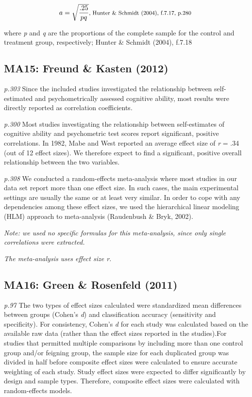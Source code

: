 \documentclass{article}
\begin{document}
\begin{equation*}
a = \sqrt{\frac{.25}{pq}}  \mbox{\footnotesize, Hunter \& Schmidt (2004), f.7.17, p.280 }
\end{equation*}

{\footnotesize where \textit{p} and \textit{q} are the proportions of the complete sample for the control and treatment group, respectively; Hunter \& Schmidt (2004), f.7.18 }


\subsection*{MA15: Freund \& Kasten (2012)}

\textit{p.303} Since the included studies investigated the relationship between self-estimated and psychometrically assessed cognitive ability, most results were directly reported as correlation coefficients. 

\textit{p.300} Most studies investigating the relationship between self-estimates of cognitive ability and psychometric test scores report significant, positive correlations. In 1982, Mabe and West reported an average effect size of \textit{r} = .34 (out of 12 effect sizes). We therefore expect to find a significant, positive overall relationship between the two variables.

\textit{p.308} We conducted a random-effects meta-analysis where most studies in our data set report more than one effect size. In such cases, the main experimental settings are usually the same or at least very similar. In order to cope with any dependencies among these effect sizes, we used the hierarchical linear modeling (HLM) approach to meta-analysis (Raudenbush \& Bryk, 2002).

\vspace{3 mm}
\textit{Note: we used no specific formulas for this meta-analysis, since only single correlations were extracted.}

\vspace{3mm}
\textit{The meta-analysis uses effect size r.}

\subsection*{MA16: Green \& Rosenfeld (2011)}

\textit{p.97} The two types of effect sizes calculated were standardized mean differences between groups (Cohen’s \textit{d}) and classification accuracy (sensitivity and specificity). For consistency, Cohen’s \textit{d} for each study was calculated based on the available raw data (rather than the effect sizes reported in the studies).For studies that permitted multiple comparisons by
including more than one control group and/or feigning group, the sample size for each duplicated group was divided in half before
composite effect sizes were calculated to ensure accurate weighting of each study. Study effect sizes were expected to differ
significantly by design and sample types. Therefore, composite effect sizes were calculated with random-effects models.
\end{document}
